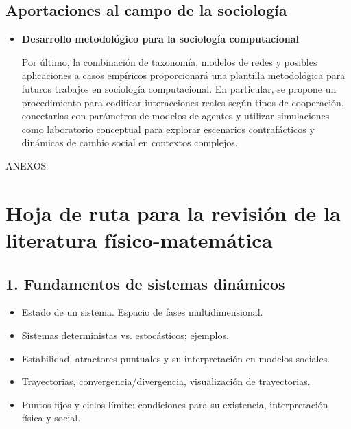 \documentclass[a4paper,11pt]{article}
\begin{document}
\begin{seccionbox}[azulsuave]{\section*{Aportaciones al campo de la sociología}}
\begin{itemize}
 \item \textbf{Desarrollo metodológico para la sociología computacional}

Por último, la combinación de taxonomía, modelos de redes y posibles aplicaciones a casos empíricos proporcionará una plantilla metodológica para futuros trabajos en sociología computacional. En particular, se propone un procedimiento para codificar interacciones reales según tipos de cooperación, conectarlas con parámetros de modelos de agentes y utilizar simulaciones como laboratorio conceptual para explorar escenarios contrafácticos y dinámicas de cambio social en contextos complejos.
\end{itemize}
\end{seccionbox}

\newpage

\vspace*{\fill}
\begin{center}
    {\fontsize{3cm}{16pt}\selectfont ANEXOS}
\end{center}
\vspace*{\fill}
   

\newpage
\section*{Hoja de ruta para la revisión de la literatura físico-matemática}

\begin{seccionbox}[rosasuave]{\subsection*{1. Fundamentos de sistemas dinámicos}}
    \begin{itemize}[leftmargin=*, label=--]
    \item Estado de un sistema. Espacio de fases multidimensional.
    \item Sistemas deterministas vs. estocásticos; ejemplos.
    \item Estabilidad, atractores puntuales y su interpretación en modelos sociales.
    \item Trayectorias, convergencia/divergencia, visualización de trayectorias.
    \item Puntos fijos y ciclos límite: condiciones para su existencia, interpretación física y social.
\end{itemize}
\end{seccionbox}
\end{document}
